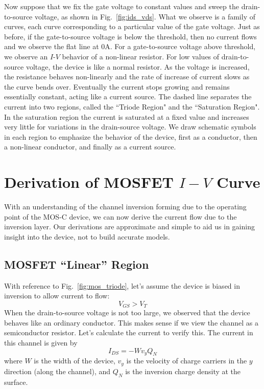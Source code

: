 Now suppose that we fix the gate voltage to constant values and sweep the drain-to-source voltage, as shown in Fig.~\ref{fig:ids_vds}.  What we observe is a family of curves, each curve corresponding to a particular value of the gate voltage.  Just as before, if the gate-to-source voltage is below the threshold, then no current flows and we observe the flat line at $0$A. For a gate-to-source voltage above threshold, we observe an $I$-$V$ behavior of a non-linear resistor.  For low values of drain-to-source voltage, the device is like a normal resistor. As the voltage is increased, the resistance behaves non-linearly and the rate of increase of current slows as the curve bends over.  
 Eventually the current stops growing and remains essentially constant, acting like a current source.  The dashed line separates the current into two regions, called the ``Triode Region" and the ``Saturation Region".  In the saturation region the current is saturated at a fixed value and increases very little for variations in the drain-source voltage.  We draw schematic symbols in each region to emphasize the behavior of the device, first as a conductor, then a non-linear conductor, and finally as a current source.
 








\section{Derivation of MOSFET $I-V$ Curve}

With an understanding of the channel inversion forming due to the operating point of the MOS-C device, we can now derive the current flow due to the inversion layer.  Our derivations are approximate and simple to aid us in gaining insight into the device, not to build accurate models.


\subsection{MOSFET ``Linear'' Region}

With reference to Fig.~\ref{fig:mos_triode}, let's assume the device is biased in inversion to allow current to flow:
\begin{equation}
	{V_{GS}} > {V_{T}}
\end{equation}
When the drain-to-source voltage is not too large, we observed that the device behaves like an ordinary conductor.  This makes sense if we view the channel as a semiconductor resistor.  Let's calculate the current to verify this.  
The current in this channel is given by
%
\begin{equation}
	{I_{DS}} =  - W{v_y}{Q_N}
\end{equation}
%
where $W$ is the width of the device, $v_y$ is the velocity of charge carriers in the $y$ direction (along the channel), and $Q_N$ is the inversion charge density at the surface.  

